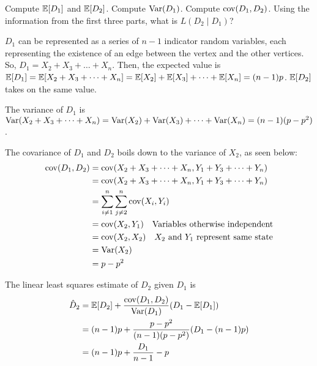 \documentclass[11pt]{article}
\begin{document}
\begin{Parts}
	\Part Compute $\operatorname{\mathbb{E}}[D_1]$ and $\operatorname{\mathbb{E}}[D_2]$.
	\Part Compute $\operatorname{Var}(D_1)$. 
	\Part Compute $\operatorname{cov}(D_1, D_2)$.
    \Part Using the information from the first three parts, what is $L(D_2 \mid D_1)$?
\end{Parts}

\begin{solution}
	
\begin{Parts}
	
\Part $D_1$ can be represented as a series of $n-1$ indicator random variables, 
each representing the existence of an edge between the vertex and the other 
vertices. So, $D_1 = X_2 + X_3 + \dots + X_n$. Then, the expected value is 
$\operatorname{\mathbb{E}}[D_1] = \operatorname{\mathbb{E}}[X_2 + X_3 + \dots + X_n] = \operatorname{\mathbb{E}}[X_2] + \operatorname{\mathbb{E}}[X_3] + \dots + \operatorname{\mathbb{E}}[X_n] = 
(n-1)p$. $\operatorname{\mathbb{E}}[D_2]$ takes on the same value. 

\Part The variance of $D_1$ is $\operatorname{Var}(X_2 + X_3 + \dots + X_n) = 
\operatorname{Var}(X_2) + \operatorname{Var}(X_3) + \dots + \operatorname{Var}(X_n) = (n-1)(p-p^2)$.

\Part The covariance of $D_1$ and $D_2$ boils down to the variance of $X_2$, as
seen below:
\[
	\begin{split}
		\operatorname{cov}(D_1, D_2) &= \operatorname{cov}(X_2 + X_3 + \dots + X_n, Y_1 + Y_3 + \dots + Y_n) \\
		&= \operatorname{cov}(X_2 + X_3 + \dots + X_n, Y_1 + Y_3 + \dots + Y_n) \\
		&= \sum_{i \neq 1}^{n} \sum_{j \neq 2}^{n} \operatorname{cov}(X_i, Y_i) \\
		&= \operatorname{cov}(X_2, Y_1) \quad \text{Variables otherwise independent} \\
		&= \operatorname{cov}(X_2, X_2) \quad \text{$X_2$ and $Y_1$ represent same state} \\ 
		&= \operatorname{Var}(X_2) \\
		&= p - p^2 
	\end{split}
\]

\Part The linear least squares estimate of $D_2$ given $D_1$ is 
\[
	\begin{split}
		\hat{D}_2 &= \operatorname{\mathbb{E}}[D_2] + \frac{\operatorname{cov}(D_1, D_2)}{\operatorname{Var}(D_1)}(D_1 - \operatorname{\mathbb{E}}[D_1]) \\
		&= (n-1)p + \frac{p-p^2}{(n-1)(p-p^2)}(D_1 - (n-1)p) \\
		&= (n-1)p + \frac{D_1}{n-1} - p \\
	\end{split}
\]

\end{Parts}

\end{solution}
\end{document}
